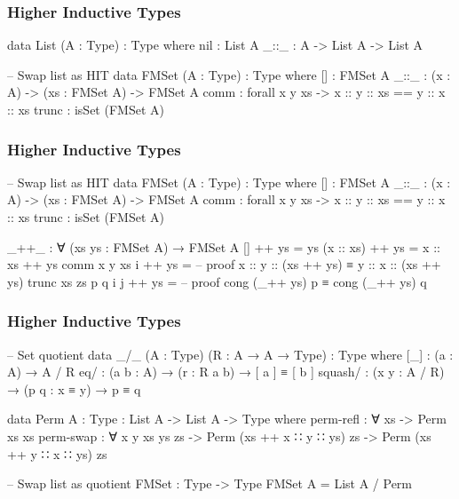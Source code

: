 \documentclass{beamer}
\begin{document}
\begin{frame}[fragile]
\frametitle{Higher Inductive Types}

\begin{code}
data List (A : Type) : Type where
  nil : List A
  _::_ : A -> List A -> List A

-- Swap list as HIT
data FMSet (A : Type) : Type where
  []    : FMSet A
  _::_  : (x : A) -> (xs : FMSet A) -> FMSet A
  comm  : forall x y xs -> x :: y :: xs == y :: x :: xs
  trunc : isSet (FMSet A)
\end{code}

\end{frame}

\begin{frame}[fragile]
\frametitle{Higher Inductive Types}

\begin{code}
-- Swap list as HIT
data FMSet (A : Type) : Type where
  []    : FMSet A
  _::_  : (x : A) -> (xs : FMSet A) -> FMSet A
  comm  : forall x y xs -> x :: y :: xs == y :: x :: xs
  trunc : isSet (FMSet A)

_++_ : ∀ (xs ys : FMSet A) → FMSet A
[] ++ ys = ys
(x :: xs) ++ ys = x :: xs ++ ys
comm x y xs i ++ ys =
  -- proof x :: y :: (xs ++ ys) ≡ y :: x :: (xs ++ ys)
trunc xs zs p q i j ++ ys =
  -- proof cong (_++ ys) p ≡ cong (_++ ys) q
\end{code}

\end{frame}

\begin{frame}[fragile]
\frametitle{Higher Inductive Types}

\begin{code}
-- Set quotient
data _/_ (A : Type) (R : A → A → Type) : Type where
  [_] : (a : A) → A / R
  eq/ : (a b : A) → (r : R a b) → [ a ] ≡ [ b ]
  squash/ : (x y : A / R) → (p q : x ≡ y) → p ≡ q

data Perm {A : Type} : List A -> List A -> Type where
  perm-refl : ∀ {xs} -> Perm xs xs
  perm-swap : ∀ {x y xs ys zs}
    -> Perm (xs ++ x ∷ y ∷ ys) zs
    -> Perm (xs ++ y ∷ x ∷ ys) zs

-- Swap list as quotient
FMSet : Type -> Type
FMSet A = List A / Perm
\end{code}

\end{frame}
\end{document}
